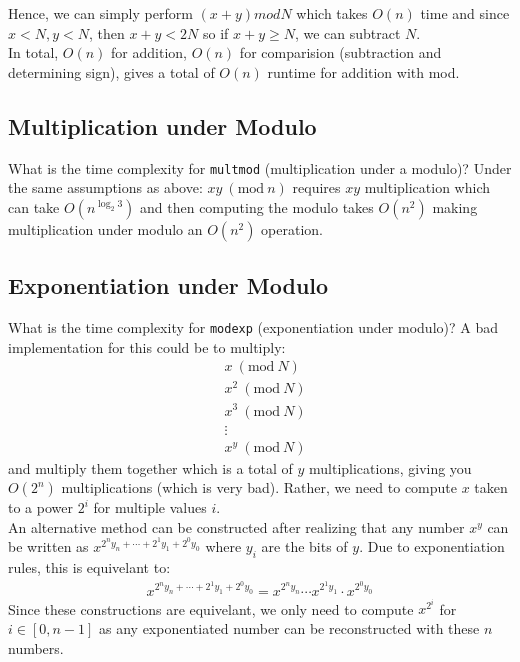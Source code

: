 \documentclass[14pt]{extarticle}
\newcommand{\Mod}[1]{\ (\mathrm{mod}\ #1)}
\begin{document}
    Hence, we can simply perform $(x + y)mod N$ which takes $O(n)$ time
    and since $x < N, y < N$, then $x + y < 2N$ so if $x + y \geq N$, we
    can subtract $N$.\\

    In total, $O(n)$ for addition, $O(n)$ for comparision (subtraction and
    determining sign), gives a total of $O(n)$ runtime for addition with
    mod.

    \subsection{Multiplication under Modulo}
    What is the time complexity for \texttt{multmod} (multiplication under
    a modulo)? Under the same assumptions as above: $xy \Mod{n}$ requires
    $xy$ multiplication which can take $O(n^{\log_2 3})$ and then computing
    the modulo takes $O(n^2)$ making multiplication under modulo an $O(n^2)$
    operation.

    \subsection{Exponentiation under Modulo}
    What is the time complexity for \texttt{modexp} (exponentiation under
    modulo)? A bad implementation for this could be to multiply:
    \begin{align*}
        &x\Mod{N}       \\
        &x^2\Mod{N}     \\
        &x^3\Mod{N}     \\
        &\vdots         \\
        &x^y\Mod{N} 
    \end{align*}
    and multiply them together which is a total of $y$ multiplications, giving
    you $O(2^n)$ multiplications (which is very bad). Rather, we need
    to compute $x$ taken to a power $2^i$ for multiple values $i$.\\

    An alternative method can be constructed after realizing that any number
    $x^y$ can be written as $x^{2^ny_n + \cdots + 2^1y_1 + 2^0y_0}$ where
    $y_i$ are the bits of $y$. Due to exponentiation rules, this is equivelant
    to:
    \begin{align*}
        x^{2^ny_n + \cdots + 2^1y_1 + 2^0y_0}
        =
        x^{2^ny_n}\cdots x^{2^1y_1} \cdot x^{2^0y_0}
    \end{align*}
    Since these constructions are equivelant, we only need to compute
    $x^{2^i}$ for $i\in [0, n-1]$ as any exponentiated number can be 
    reconstructed with these $n$ numbers. 
\end{document}
